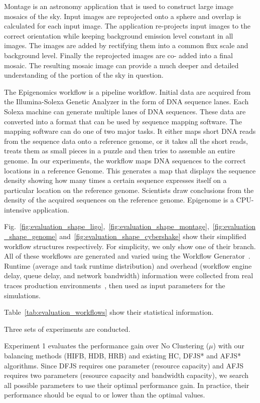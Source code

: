 Montage is an astronomy application that is used to construct large image mosaics of the sky. Input images are reprojected onto a sphere and overlap is calculated for each input image. The application re-projects input images to the correct orientation while keeping background emission level constant in all images. The images are added by rectifying them into a common flux scale and background level. Finally the reprojected images are co- added into a final mosaic. The resulting mosaic image can provide a much deeper and detailed understanding of the portion of the sky in question.

The Epigenomics workflow is a pipeline workflow. Initial data are acquired from the Illumina-Solexa Genetic Analyzer in the form of DNA sequence lanes. Each Solexa machine can generate multiple lanes of DNA sequences. These data are converted into a format that can be used by sequence mapping software. The mapping software can do one of two major tasks. It either maps short DNA reads from the sequence data onto a reference genome, or it takes all the short reads, treats them as small pieces in a puzzle and then tries to assemble an entire genome. In our experiments, the workflow maps DNA sequences to the correct locations in a reference Genome. This generates a map that displays the sequence density showing how many times a certain sequence expresses itself on a particular location on the reference genome. Scientists draw conclusions from the density of the acquired sequences on the reference genome. Epigenome is a CPU-intensive application. 

Fig.~\ref{fig:evaluation_shape_ligo},~\ref{fig:evaluation_shape_montage},~\ref{fig:evaluation_shape_genome} and~\ref{fig:evaluation_shape_cybershake} show their simplified workflow structures respectively. For simplicity, we only show one of their branch. 
All of these workflows are generated and varied using the Workflow Generator~\cite{WorkflowGenerator}. Runtime (average and task runtime distribution) and overhead (workflow engine delay, queue delay, and network bandwidth) information were collected from real traces production environments~\cite{Chen2011, Juve2013}, then used as input parameters for the simulations. 

Table~\ref{tab:evaluation_workflows} show their statistical information. 

Three sets of experiments are conducted. 

Experiment 1 evaluates the performance gain over No Clustering ($\mu$) with our balancing methods (HIFB, HDB, HRB) and existing HC, DFJS* and AFJS* algorithms. Since DFJS requires one parameter (resource capacity) and AFJS requires two parameters (resource capacity and bandwidth capacity), we search all possible parameters to use their optimal performance gain. In practice, their performance should be equal to or lower than the optimal values. 

